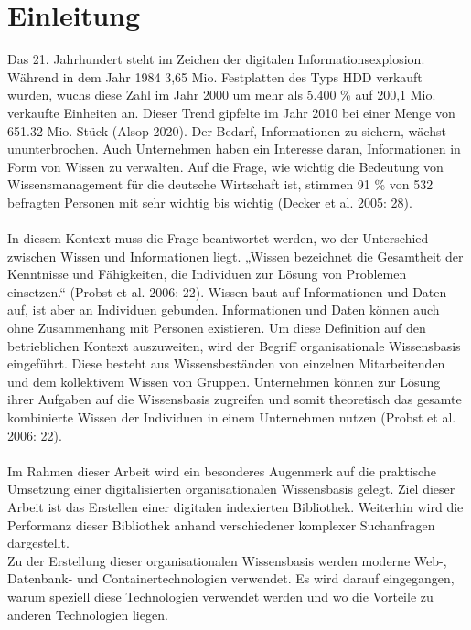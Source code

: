 \documentclass[a4paper]{scrartcl}
\begin{document}
\newpage

\listoffigures


\newpage

\listoftables


\newpage

\setcounter{page}{1}


\section{Einleitung}
Das 21. Jahrhundert steht im Zeichen der digitalen Informationsexplosion. Während in dem Jahr 1984 3,65 Mio. Festplatten des Typs HDD verkauft wurden, wuchs diese Zahl im Jahr 2000 um mehr als 5.400 \% auf 200,1 Mio. verkaufte Einheiten an. Dieser Trend gipfelte im Jahr 2010 bei einer Menge von 651.32 Mio. Stück (Alsop 2020). Der Bedarf, Informationen zu sichern, wächst ununterbrochen. Auch Unternehmen haben ein Interesse daran, Informationen in Form von Wissen zu verwalten. Auf die Frage, wie wichtig die Bedeutung von Wissensmanagement für die deutsche Wirtschaft ist, stimmen 91 \% von 532 befragten Personen mit sehr wichtig bis wichtig (Decker et al. 2005: 28). \\ \\
In diesem Kontext muss die Frage beantwortet werden, wo der Unterschied zwischen Wissen und Informationen liegt. „Wissen bezeichnet die Gesamtheit der Kenntnisse und Fähigkeiten, die Individuen zur Lösung von Problemen einsetzen.“ (Probst et al. 2006: 22). Wissen baut auf Informationen und Daten auf, ist aber an Individuen gebunden. Informationen und Daten können auch ohne Zusammenhang mit Personen existieren. Um diese Definition auf den betrieblichen Kontext auszuweiten, wird der Begriff organisationale Wissensbasis eingeführt. Diese besteht aus Wissensbeständen von einzelnen Mitarbeitenden und dem kollektivem Wissen von Gruppen. Unternehmen können zur Lösung ihrer Aufgaben auf die Wissensbasis zugreifen und somit theoretisch das gesamte kombinierte Wissen der Individuen in einem Unternehmen nutzen (Probst et al. 2006: 22). \\ \\
Im Rahmen dieser Arbeit wird ein besonderes Augenmerk auf die praktische Umsetzung einer digitalisierten organisationalen Wissensbasis gelegt. Ziel dieser Arbeit ist das Erstellen einer digitalen indexierten Bibliothek. Weiterhin wird die Performanz dieser Bibliothek anhand verschiedener komplexer Suchanfragen dargestellt. \\
Zu der Erstellung dieser organisationalen Wissensbasis werden moderne Web-, Datenbank- und Containertechnologien verwendet. Es wird darauf eingegangen, warum speziell diese Technologien verwendet werden und wo die Vorteile zu anderen Technologien liegen.
\end{document}
